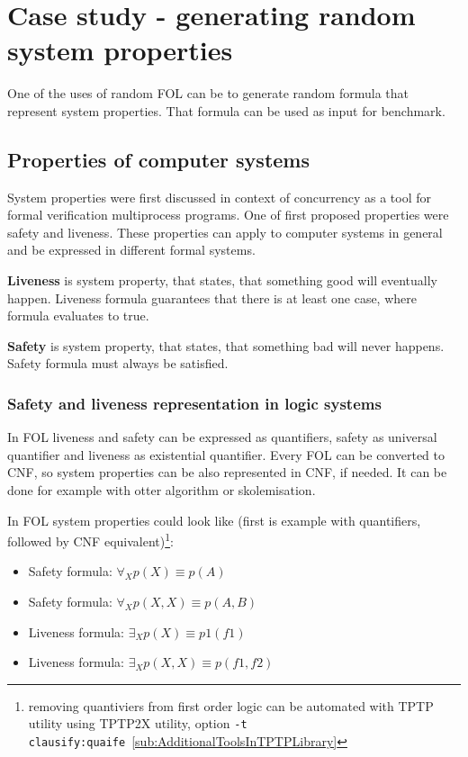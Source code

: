 \chapter{Case study - generating random system properties}

One of the uses of random \gls{FOL} can be to generate random formula that represent system properties. That formula can be used as input for benchmark.

\section{Properties of computer systems}

System properties were first discussed in context of concurrency \cite{Lampert77} as a tool for formal verification multiprocess programs. One of first proposed properties were safety and liveness. These properties can apply to computer systems in general and be expressed in different formal systems.

\textbf{Liveness} \cite{Klimek99} is system property, that states, that something good will eventually happen.
Liveness formula guarantees that there is at least one case, where formula evaluates to true.

\textbf{Safety} \cite{Klimek99} is system property, that states, that something bad will never happens.
Safety formula must always be satisfied.

\subsection{Safety and liveness representation in logic systems}

In \gls{FOL} liveness and safety can be expressed as quantifiers, safety as universal quantifier and liveness as existential quantifier. Every \gls{FOL} can be converted to \gls{CNF}, so system properties can be also represented in \gls{CNF}, if needed. It can be done for example with otter algorithm \cite{McC-Otter-URL} or skolemisation.

In \gls{FOL} system properties could look like (first is example with quantifiers, followed by CNF equivalent)\footnote{removing quantiviers from first order logic can be automated with TPTP utility using TPTP2X utility, option \texttt{-t clausify:quaife}~\ref{sub:AdditionalToolsInTPTPLibrary} }:
\begin{itemize}
  \item Safety formula: $\forall_X p(X) \equiv p(A)$
  \item Safety formula: $\forall_X p(X, X) \equiv p(A, B)$
  \item Liveness formula: $\exists_X p(X) \equiv p1(f1)$
  \item Liveness formula: $\exists_X p(X, X) \equiv p(f1, f2)$
\end{itemize}

